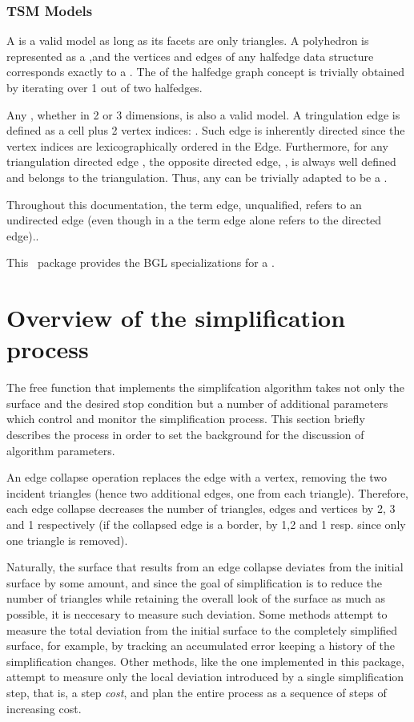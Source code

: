 \subsubsection{TSM Models}

A  is a valid  model as long as its facets are only triangles. A polyhedron is represented as a ,and the vertices and edges of any halfedge data structure corresponds exactly to a . The  of the halfedge graph concept is trivially obtained by iterating over 1 out of two halfedges.

Any , whether in 2 or 3 dimensions, is also a valid  model. A tringulation edge is defined as a cell plus 2 vertex indices: . Such edge is inherently directed since the vertex indices are lexicographically ordered in the Edge. Furthermore, for any triangulation directed edge , the opposite directed edge, , is always well defined and belongs to the triangulation. Thus, any  can be trivially adapted to be a . 

Throughout this documentation, the term edge, unqualified, refers to an undirected edge (even though in a  the term edge alone refers to the directed edge)..

This \cgal\ package provides the BGL specializations for a .

\section{Overview of the simplification process}

The free function that implements the simplifcation algorithm takes not only the surface and the desired stop condition but a number of additional parameters which control and monitor the simplification process. This section briefly describes the process in order to set the background for the discussion of algorithm parameters.

An edge collapse operation replaces the edge with a vertex, removing the two incident triangles (hence two additional edges, one from each triangle). Therefore, each edge collapse decreases the number of triangles, edges and vertices by 2, 3 and 1 respectively (if the collapsed edge is a border, by 1,2 and 1 resp. since only one triangle is removed).

Naturally, the surface that results from an edge collapse deviates from the initial surface by some amount, and since the goal of simplification is to reduce the number of triangles while retaining the overall look of the surface as much as possible, it is neccesary to measure such deviation. Some methods attempt to measure the total deviation from the initial surface to the completely simplified surface, for example, by tracking an accumulated error keeping a history of the simplification changes. Other methods, like the one implemented in this package, attempt to measure only the local deviation introduced by a single simplification step, that is, a step {\em cost}, and plan the entire process as a sequence of steps of increasing cost. 

